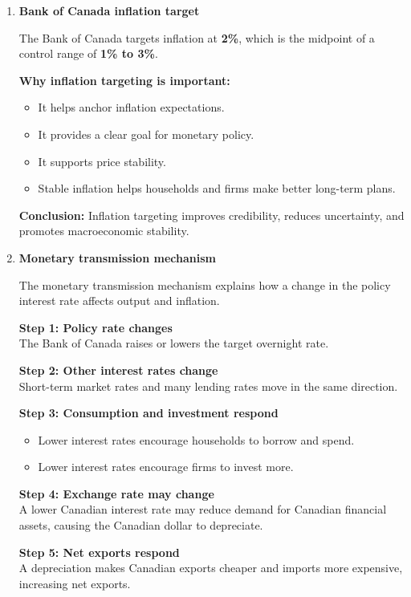 \documentclass[12pt]{article}
\begin{document}
\begin{enumerate}[label=\textbf{\arabic*.}, start=7]

\item \textbf{Bank of Canada inflation target}

The Bank of Canada targets inflation at \textbf{2\%}, which is the midpoint of a control range of \textbf{1\% to 3\%}.

\textbf{Why inflation targeting is important:}
\begin{itemize}
    \item It helps anchor inflation expectations.
    \item It provides a clear goal for monetary policy.
    \item It supports price stability.
    \item Stable inflation helps households and firms make better long-term plans.
\end{itemize}

\textbf{Conclusion:}
Inflation targeting improves credibility, reduces uncertainty, and promotes macroeconomic stability.


\item \textbf{Monetary transmission mechanism}

The monetary transmission mechanism explains how a change in the policy interest rate affects output and inflation.

\textbf{Step 1: Policy rate changes}\\
The Bank of Canada raises or lowers the target overnight rate.

\textbf{Step 2: Other interest rates change}\\
Short-term market rates and many lending rates move in the same direction.

\textbf{Step 3: Consumption and investment respond}\\
\begin{itemize}
    \item Lower interest rates encourage households to borrow and spend.
    \item Lower interest rates encourage firms to invest more.
\end{itemize}

\textbf{Step 4: Exchange rate may change}\\
A lower Canadian interest rate may reduce demand for Canadian financial assets, causing the Canadian dollar to depreciate.

\textbf{Step 5: Net exports respond}\\
A depreciation makes Canadian exports cheaper and imports more expensive, increasing net exports.


\end{enumerate}
\end{document}
